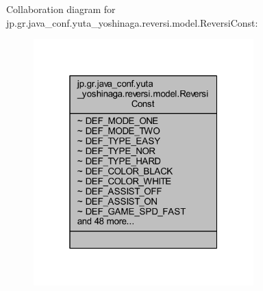 Collaboration diagram for jp.\+gr.\+java\+\_\+conf.\+yuta\+\_\+yoshinaga.\+reversi.\+model.\+Reversi\+Const\+:\nopagebreak
\begin{figure}[H]
\begin{center}
\leavevmode
\includegraphics[width=241pt]{classjp_1_1gr_1_1java__conf_1_1yuta__yoshinaga_1_1reversi_1_1model_1_1_reversi_const__coll__graph}
\end{center}
\end{figure}

